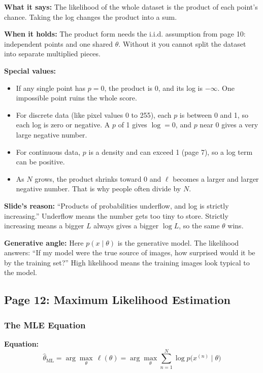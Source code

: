 \textbf{What it says:} The likelihood of the whole dataset is the product of each point's chance. Taking the log changes the product into a sum.

\textbf{When it holds:} The product form needs the i.i.d. assumption from page 10: independent points and one shared $\theta$. Without it you cannot split the dataset into separate multiplied pieces.

\textbf{Special values:}
\begin{itemize}
  \item If any single point has $p = 0$, the product is 0, and its log is $-\infty$. One impossible point ruins the whole score.
  \item For discrete data (like pixel values 0 to 255), each $p$ is between 0 and 1, so each log is zero or negative. A $p$ of 1 gives $\log = 0$, and $p$ near 0 gives a very large negative number.
  \item For continuous data, $p$ is a density and can exceed 1 (page 7), so a log term can be positive.
  \item As $N$ grows, the product shrinks toward 0 and $\ell$ becomes a larger and larger negative number. That is why people often divide by $N$.
\end{itemize}

\textbf{Slide's reason:} ``Products of probabilities underflow, and log is strictly increasing.'' Underflow means the number gets too tiny to store. Strictly increasing means a bigger $L$ always gives a bigger $\log L$, so the same $\theta$ wins.

\textbf{Generative angle:} Here $p(x \mid \theta)$ is the generative model. The likelihood answers: ``If my model were the true source of images, how surprised would it be by the training set?'' High likelihood means the training images look typical to the model.

\subsection*{Page 12: Maximum Likelihood Estimation}

\subsubsection*{The MLE Equation}

\textbf{Equation:}
\[
\hat{\theta}_{\mathrm{ML}} = \arg\max_{\theta}\, \ell(\theta) = \arg\max_{\theta} \sum_{n=1}^{N} \log p\bigl(x^{(n)} \mid \theta\bigr)
\]

